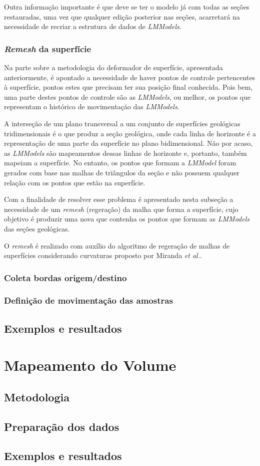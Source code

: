 Outra informação importante é que deve se ter o modelo já com todas as seções restauradas, uma vez que qualquer edição posterior nas seções, acarretará na necessidade de recriar a estrutura de dados de \textit{LMModels}.

\subsubsection{\textit{Remesh} da superfície}

Na parte sobre a metodologia do deformador de superfície, apresentada anteriormente, é apontado a necessidade de haver pontos de controle pertencentes à superfície, pontos estes que precisam ter sua posição final conhecida. Pois bem, uma parte destes pontos de controle são as \textit{LMModels}, ou melhor, os pontos que representam o histórico de movimentação das \textit{LMModels}.

A interseção de um plano transversal a um conjunto de superfícies geológicas tridimensionais é o que produz a seção geológica, onde cada linha de horizonte é a representação de uma parte da superfície no plano bidimensional. Não por acaso, as \textit{LMModels} são mapeamentos dessas linhas de horizonte e, portanto, também mapeiam a superfície. No entanto, os pontos que formam a \textit{LMModel} foram gerados com base nas malhas de triângulos da seção e não possuem qualquer relação com os pontos que estão na superfície.

Com a finalidade de resolver esse problema é apresentado nesta subseção a necessidade de um \textit{remesh} (regeração) da malha que forma a superfície, cujo objetivo é produzir uma nova que contenha os pontos que formam as \textit{LMModels} das seções geológicas.

O \textit{remesh} é realizado com auxílio do algoritmo de regeração de malhas de superfícies considerando curvaturas proposto por Miranda \textit{et al.}\cite{Miranda}.

\subsubsection{Coleta bordas origem/destino}

\subsubsection{Definição de movimentação das amostras}


\subsection{Exemplos e resultados}

\section{Mapeamento do Volume}

\subsection{Metodologia}

\subsection{Preparação dos dados}

\subsection{Exemplos e resultados}


